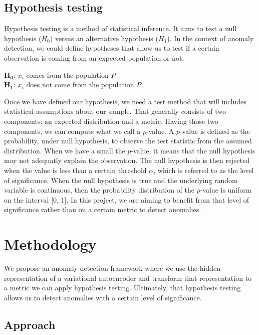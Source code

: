 \documentclass{article}
\begin{document}
\subsection{Hypothesis testing}

Hypothesis testing is a method of statistical inference. It aims to test a null hypothesis ($H_0$) versus an alternative hypothesis ($H_1$). In the context of anomaly detection, we could define hypotheses that allow us to test if a certain observation is coming from an expected population or not:
\newline

\noindent $\boldsymbol{H_0}$: $x_i$ comes from the population $P$ \\
$\boldsymbol{H_1}$: $x_i$ does not come from the population $P$
\newline

\noindent Once we have defined our hypothesis, we need a test method that will includes statistical assumptions about our sample. That generally consists of two components: an expected distribution and a metric. Having those two components, we can compute what we call a $p$-value. A $p$-value is defined as the probability, under null hypothesis, to observe the test statistic from the assumed distribution. When we have a small the $p$-value, it means that the null hypothesis may not adequatly explain the observation. The null hypothesis is then rejected when the value is less than a certain threshold $\alpha$, which is referred to as the level of significance. When the null hypothesis is true and the underlying random variable is continuous, then the probability distribution of the $p$-value is uniform on the interval [0, 1]. In this project, we are aiming to benefit from that level of significance rather than on a certain metric to detect anomalies.


\section{Methodology}

We propose an anomaly detection framework where we use the hidden representation of a variational autoencoder and transform that representation to a metric we can apply hypothesis testing. Ultimately, that hypothesis testing allows us to detect anomalies with a certain level of significance.

\subsection{Approach}
\end{document}
